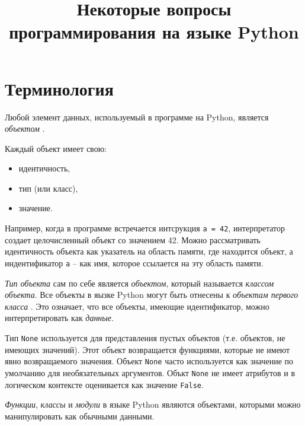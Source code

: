 \documentclass[%
	11pt,
	a4paper,
	utf8,
		]{article}
\begin{document}
\title{Некоторые вопросы программирования на языке Python}

\author{}

\date{}
\maketitle

\thispagestyle{fancy}

\tableofcontents

\section{Терминология}

Любой элемент данных, используемый в программе на Python, является \emph{объектом} \cite[]{beazley:python-2010}.

Каждый объект имеет свою:
\begin{itemize}
	\item идентичность,
	
	\item тип (или класс),
	
	\item значение.
\end{itemize}

Например, когда в программе встречается интсрукция \verb|a = 42|, интерпретатор создает целочисленный объект со значением 42. Можно рассматривать идентичность объекта как указатель на область памяти, где находится объект, а индентификатор \texttt{a} -- как имя, которое ссылается на эту область памяти.

\emph{Тип объекта} сам по себе является \emph{объектом}, который называется \emph{классом объекта}. Все объекты в яызке Python могут быть отнесены к \emph{объектам первого класса} \cite[]{beazley:python-2010}. Это означает, что все объекты, имеющие идентификатор, можно интерпретировать как \emph{данные}.

Тип \texttt{None} используется для представления пустых объектов (т.е. объектов, не имеющих значений). Этот объект возвращается функциями, которые не имеют явно возвращаемого значения. Объект \texttt{None} часто используется как значение по умолчанию для необязательных аргументов. Объкт \texttt{None} не имеет атрибутов и в логическом контексте оценивается как значение \texttt{False}.

\emph{Функции}, \emph{классы} и \emph{модули} в языке Python являются объектами, которыми можно манипулировать как обычными данными.
\end{document}
